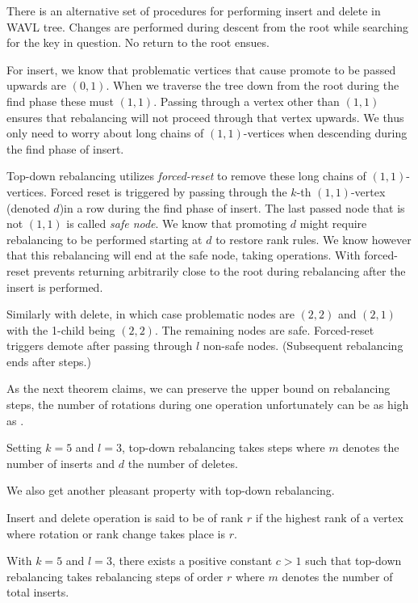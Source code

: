There is an alternative set of procedures for performing insert and delete in WAVL tree. Changes are performed during descent from the root while searching for the key in question. No return to the root ensues.

For insert, we know that problematic vertices that cause promote to be passed upwards are $(0,1)$. When we traverse the tree down from the root during the find phase these must $(1,1)$. Passing through a vertex other than $(1,1)$ ensures that rebalancing will not proceed through that vertex upwards. We thus only need to worry about long chains of $(1,1)$-vertices when descending during the find phase of insert.

Top-down rebalancing utilizes \textit{forced-reset} to remove these long chains of $(1,1)$-vertices. Forced reset is triggered by passing through the $k$-th $(1,1)$-vertex (denoted $d$)in a row during the find phase of insert. The last passed node that is not $(1,1)$ is called \textit{safe node}. We know that promoting $d$ might require rebalancing to be performed starting at $d$ to restore rank rules. We know however that this rebalancing will end at the safe node, taking  operations.
With forced-reset prevents returning arbitrarily close to the root during rebalancing after the insert is performed.

Similarly with delete, in which case problematic nodes are $(2,2)$ and $(2,1)$ with the 1-child being $(2,2)$. The remaining nodes are safe. Forced-reset triggers demote after passing through $l$ non-safe nodes. (Subsequent rebalancing ends after  steps.)

As the next theorem claims, we can preserve the upper bound on rebalancing steps, the number of rotations during one operation unfortunately can be as high as .

\begin{thm}
Setting $k=5$ and $l=3$, top-down rebalancing takes  steps where $m$ denotes the number of inserts and $d$ the number of deletes.
\end{thm}

We also get another pleasant property with top-down rebalancing.

\begin{defn}
Insert and delete operation is said to be of rank $r$ if the highest rank of a vertex where rotation or rank change takes place is $r$.
\end{defn}

\begin{thm}
With $k=5$ and $l=3$, there exists a positive constant $c > 1$ such that top-down rebalancing takes  rebalancing steps of order $r$ where $m$ denotes the number of total inserts.
\end{thm}